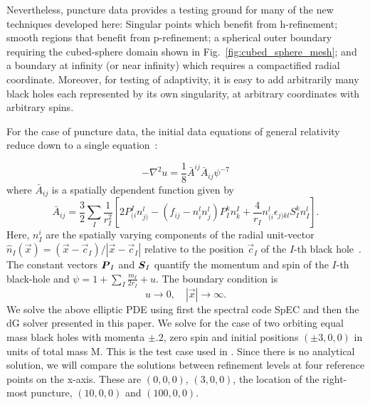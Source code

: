 Nevertheless, puncture data provides a testing ground for many
  of the new techniques developed here: Singular points which benefit
  from h-refinement; smooth regions that benefit from p-refinement; a
  spherical outer boundary requiring the cubed-sphere domain shown in
  Fig.~\ref{fig:cubed_sphere_mesh}; and a boundary at infinity (or
  near infinity) which requires a compactified radial coordinate.
  Moreover, for testing of adaptivity, it is easy to add arbitrarily
  many black holes each represented by its own singularity, at
  arbitrary coordinates with arbitrary spins.

For the case of puncture data, the initial data equations of general relativity
reduce down to a single equation~\cite{brandt1997simple}:

\begin{equation}
\label{eq:Two_Punctures_PDE}
-\nabla^2 u = \frac{1}{8}\bar A^{ij} \bar A_{ij}\psi^{-7}
\end{equation}
%
where $\bar A_{ij}$ is a spatially dependent function given by
%
\begin{equation}
  \label{eq:Two_Punctures_Aij}
\bar{A}_{ij} = \frac{3}{2}\sum_{I}\frac{1}{r^{2}_{I}}[2P^{I}_{(i}n^{l}_{j)}-(f_{ij}-n^{l}_{i}n^l_j)P^{k}_{I}n^I_k + \frac{4}{r_{I}}n^l_{(i}\epsilon_{j)kl}S^k_In^l_I].
\end{equation}
%
Here, $n^i_I$ are the spatially varying components of the radial unit-vector $\hat n_{I}(\vec x)=(\vec{x}-\vec c_{I})/|\vec x-\vec c_I|$ relative to the position $\vec c_I$ of the $I$-th black hole~\cite{brandt1997simple}. The constant vectors $\boldsymbol{P}_{I}$ and $\boldsymbol{S}_{I}$
quantify the momentum and spin of the $I$-th black-hole and $\psi = 1 + \sum_I \frac{m_{I}}{2r_{I}}+u$. The boundary condition is
%
\begin{equation}
  u\to 0,\quad |\vec x| \to \infty.
\end{equation}
%
We solve the above elliptic PDE using first the spectral code SpEC and
then the dG solver presented in this paper. We solve for the case of
two orbiting equal mass black holes with momenta $\pm .2$, zero spin
and initial positions $(\pm 3, 0, 0)$ in units of total mass M. This
is the test case used in \cite{ansorg2007}. Since there is no
analytical solution, we will compare the solutions between refinement
levels at four reference points on the x-axis. These are $(0,0,0)$,
$(3,0,0)$, the location of the right-most puncture, $(10,0,0)$ and
$(100,0,0)$.

